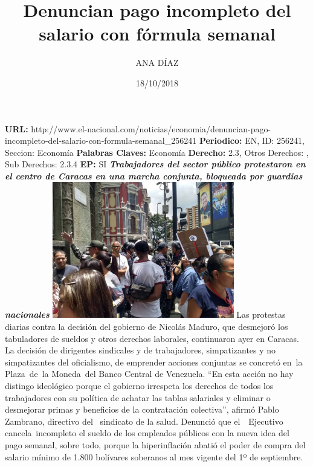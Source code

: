 \documentclass{article}%
\title{\textbf{Denuncian pago incompleto del salario con fórmula semanal}}%
\author{ANA DÍAZ}%
\date{18/10/2018}%
\begin{document}
%
\normalsize%
\maketitle%
\textbf{URL: }%
http://www.el{-}nacional.com/noticias/economia/denuncian{-}pago{-}incompleto{-}del{-}salario{-}con{-}formula{-}semanal\_256241\newline%
%
\textbf{Periodico: }%
EN, %
ID: %
256241, %
Seccion: %
Economía\newline%
%
\textbf{Palabras Claves: }%
Economía\newline%
%
\textbf{Derecho: }%
2.3, %
Otros Derechos: %
, %
Sub Derechos: %
2.3.4\newline%
%
\textbf{EP: }%
SI\newline%
\newline%
%
\textbf{\textit{Trabajadores del sector público protestaron en el centro de Caracas en una marcha conjunta, bloqueada por guardias nacionales}}%
\newline%
\newline%
%
\includegraphics[width=300px]{158.jpg}%
\newline%
%
Las protestas diarias contra la decisión del gobierno de Nicolás Maduro, que desmejoró los tabuladores de sueldos y otros derechos laborales, continuaron ayer en Caracas. La decisión de dirigentes sindicales y de trabajadores, simpatizantes y no simpatizantes del oficialismo, de emprender acciones conjuntas se concretó en~la Plaza~de~la Moneda~del Banco Central de Venezuela.%
\newline%
%
“En esta acción no hay distingo ideológico porque el gobierno irrespeta los derechos de todos los trabajadores con su política de achatar las tablas salariales y eliminar o desmejorar primas y beneficios de la contratación colectiva”, afirmó Pablo Zambrano, directivo del ~sindicato de la salud.%
\newline%
%
Denunció que el~~Ejecutivo cancela~incompleto el sueldo de los empleados públicos con la nueva idea del pago semanal, sobre todo, porque la hiperinflación abatió el poder de compra del salario mínimo de 1.800 bolívares soberanos al mes vigente del 1º de septiembre.%
\end{document}
